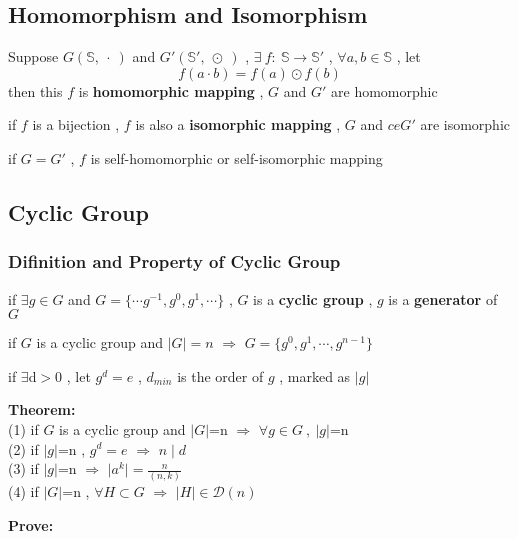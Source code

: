 \documentclass{ctexart}
\begin{document}
\vspace{12 pt}
\subsection{Homomorphism and Isomorphism}
Suppose \(G(\mathbb{S},\ \cdot\ )\) and \(G'(\mathbb{S'},\ \odot\ )\) , \(\exists \ f :\ \mathbb{S}\rightarrow \mathbb{S'}\) , \(\forall a,b \in \mathbb{S}\) , let
\[f(a\cdot b)=f(a)\odot f(b)\]
then this \(f\) is \textbf{homomorphic mapping} , \(G\) and \(G'\) are homomorphic 

\noindent if \(f\) is a bijection , \(f\) is also a \textbf{isomorphic mapping} , \(G\) and \(ceG'\) are isomorphic

\vspace{12 pt}
if \(G=G'\) , \(f\) is self-homomorphic or self-isomorphic mapping

\vspace{12 pt}
\subsection{Cyclic Group}
\subsubsection{Difinition and Property of Cyclic Group}
if \(\exists g \in G\) and \(G=\{ \cdots g^{-1},g^0,g^1,\cdots\}\) , \(G\) is a \textbf{cyclic group} , \(g\) is a \textbf{generator} of \(G\)  

if \(G\) is a cyclic group and \(\vert G \vert =n\) \(\Rightarrow\) \(G=\{g^0,g^1,\cdots, g^{n-1}\}\)

if \(\exists\)d\(>0\) , let \(g^d=e\) , \(d_{min}\) is the order of \(g\) , marked as \(\vert g\vert\)

\vspace{12 pt}
\textbf{Theorem:}
\\(1) if \(G\) is a cyclic group and \(\vert G\vert \)=n \(\Rightarrow\) \(\forall g\in G\ ,\ \vert g\vert\)=n
\\(2) if \(\vert g \vert \)=n , \(g^d=e\) \(\Rightarrow\) \(n\mid d\)
\\(3) if \(\vert g\vert\)=n \(\Rightarrow\) \(\vert a^k\vert = \frac{n}{(n,k)}\)
\\(4) if \(\vert G\vert\)=n , \(\forall H\subset G\) \(\Rightarrow\) \(\vert H \vert\in \mathcal{D}(n)\)

\vspace{12 pt}
\textbf{Prove:}
\end{document}
